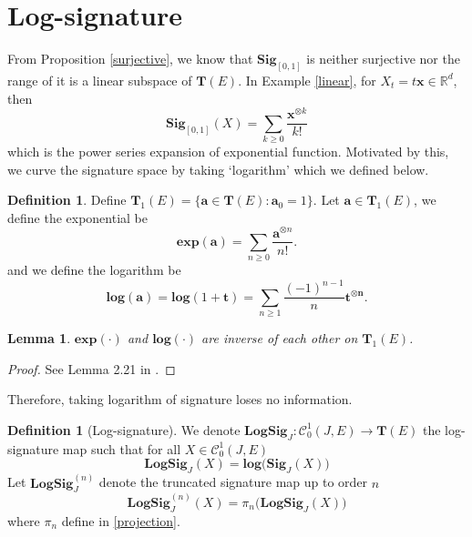 \documentclass[12pt]{report}
\newtheorem{lemma}[theorem]{Lemma}
\theoremstyle{definition}
\newtheorem{definition}[theorem]{Definition}
\theoremstyle{remark}
\newcommand{\R}{\mathbb{R}}
\begin{document}
\section{Log-signature}
From Proposition \ref{surjective}, we know that $\mathbf{Sig}_{[0,1]}$ is neither surjective nor the range of it is a linear subspace of $\mathbf{T}(E)$. In Example \ref{linear}, for $X_{t} = t\mathbf{x} \in \R^{d}$, then 
  \begin{equation}
    \mathbf{Sig}_{[0,1]}(X) = \sum_{k\geq 0}\frac{\mathbf{x}^{\otimes k}}{k!}
  \end{equation}
  which is the power series expansion of exponential function. Motivated by this, we curve the signature space by taking `logarithm' which we defined below. 
\begin{definition}
  Define $\mathbf{T}_{1}(E) = \{\mathbf{a} \in \mathbf{T}(E)\colon \mathbf{a}_{0} = 1\}$. Let $\mathbf{a} \in \mathbf{T}_{1}(E)$, we define the exponential be 
  \begin{equation}
    \mathbf{exp}(\mathbf{a}) = \sum_{n\geq 0}\frac{\mathbf{a}^{\otimes n}}{n!}.
  \end{equation}
  and we define the logarithm be
  \begin{equation}
    \mathbf{log}(\mathbf{a}) = \mathbf{log}(1+\mathbf{t}) = \sum_{n\geq 1} \frac{(-1)^{n-1}}{n}\mathbf{t}^{\otimes \mathbf{n}}.
  \end{equation}
\end{definition}
\begin{lemma}
  $\mathbf{exp}(\cdot)$ and $\mathbf{log}(\cdot)$ are inverse of each other on $\mathbf{T}_{1}(E)$.
\end{lemma}
\begin{proof}
  See Lemma 2.21 in \cite{lyons2007differential}.
\end{proof}
Therefore, taking logarithm of signature loses no information.
\begin{definition}[Log-signature]
  We denote $\mathbf{LogSig}_{J} \colon \mathcal{C}^{1}_{0}(J,E) \to \mathbf{T}(E)$ the log-signature map such that for all $X \in \mathcal{C}^{1}_{0}(J,E)$
  \begin{equation}
    \mathbf{LogSig}_{J}(X) = \mathbf{log}\big(\mathbf{Sig}_{J}(X)\big)
  \end{equation}
  Let $\mathbf{LogSig}^{(n)}_{J}$ denote the truncated signature map up to order $n$
  \begin{equation}
    \mathbf{LogSig}^{(n)}_{J}(X) = \pi_{n}\big(\mathbf{LogSig}_{J}(X)\big)
  \end{equation}
  where $\pi_n$ define in \eqref{projection}.
\end{definition}
\end{document}

